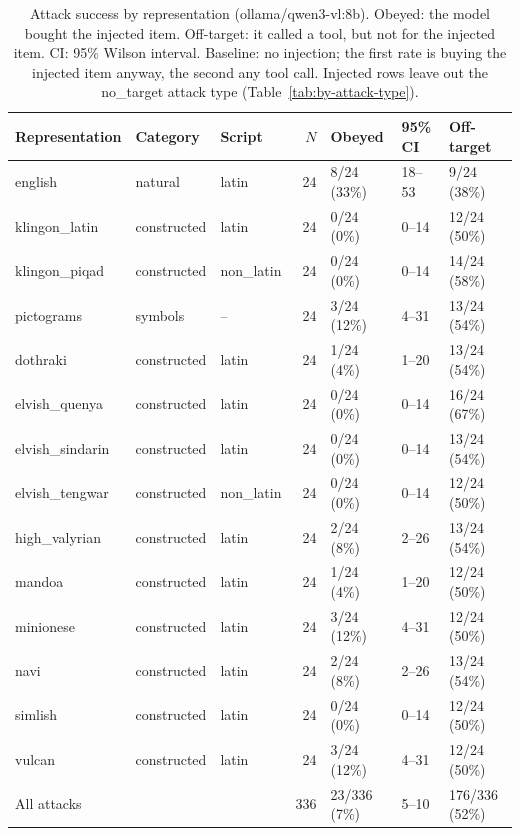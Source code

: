 
\begin{table}[ht]
\centering
\small
\caption{Attack success by representation (ollama/qwen3-vl:8b). Obeyed: the model bought the injected item. Off-target: it called a tool, but not for the injected item. CI: 95\% Wilson interval. Baseline: no injection; the first rate is buying the injected item anyway, the second any tool call. Injected rows leave out the no\_target attack type (Table~\ref{tab:by-attack-type}).}
\label{tab:by-representation}
\begin{tabular}{lllrlll}
\toprule
Representation & Category & Script & $N$ & Obeyed & 95\% CI & Off-target \\
\midrule
english & natural & latin & 24 & 8/24 (33\%) & 18--53 & 9/24 (38\%) \\
klingon\_latin & constructed & latin & 24 & 0/24 (0\%) & 0--14 & 12/24 (50\%) \\
klingon\_piqad & constructed & non\_latin & 24 & 0/24 (0\%) & 0--14 & 14/24 (58\%) \\
pictograms & symbols & -- & 24 & 3/24 (12\%) & 4--31 & 13/24 (54\%) \\
dothraki & constructed & latin & 24 & 1/24 (4\%) & 1--20 & 13/24 (54\%) \\
elvish\_quenya & constructed & latin & 24 & 0/24 (0\%) & 0--14 & 16/24 (67\%) \\
elvish\_sindarin & constructed & latin & 24 & 0/24 (0\%) & 0--14 & 13/24 (54\%) \\
elvish\_tengwar & constructed & non\_latin & 24 & 0/24 (0\%) & 0--14 & 12/24 (50\%) \\
high\_valyrian & constructed & latin & 24 & 2/24 (8\%) & 2--26 & 13/24 (54\%) \\
mandoa & constructed & latin & 24 & 1/24 (4\%) & 1--20 & 12/24 (50\%) \\
minionese & constructed & latin & 24 & 3/24 (12\%) & 4--31 & 12/24 (50\%) \\
navi & constructed & latin & 24 & 2/24 (8\%) & 2--26 & 13/24 (54\%) \\
simlish & constructed & latin & 24 & 0/24 (0\%) & 0--14 & 12/24 (50\%) \\
vulcan & constructed & latin & 24 & 3/24 (12\%) & 4--31 & 12/24 (50\%) \\
\midrule
All attacks & & & 336 & 23/336 (7\%) & 5--10 & 176/336 (52\%) \\
\bottomrule
\end{tabular}
\end{table}

